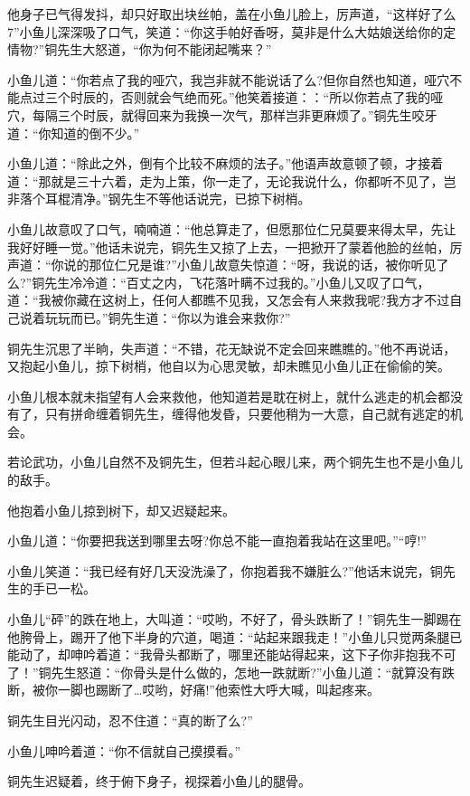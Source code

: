 \documentclass[12pt,oneside]{book}
\begin{document}
他身子已气得发抖，却只好取出块丝帕，盖在小鱼儿脸上，厉声道，``这样好了么7''小鱼儿深深吸了口气，笑道：``你这手帕好香呀，莫非是什么大姑娘送给你的定情物?''铜先生大怒道，``你为何不能闭起嘴来？''

小鱼儿道：``你若点了我的哑穴，我岂非就不能说话了么?但你自然也知道，哑穴不能点过三个时辰的，否则就会气绝而死。''他笑着接道：：``所以你若点了我的哑穴，每隔三个时辰，就得回来为我换一次气，那样岂非更麻烦了。''铜先生咬牙道：``你知道的倒不少。''

小鱼儿道：``除此之外，倒有个比较不麻烦的法子。''他语声故意顿了顿，才接着道：``那就是三十六着，走为上策，你一走了，无论我说什么，你都听不见了，岂非落个耳棍清净。''钢先生不等他话说完，已掠下树梢。

小鱼儿故意叹了口气，喃喃道：``他总算走了，但愿那位仁兄莫要来得太早，先让我好好睡一觉。''他话未说完，铜先生又掠了上去，一把掀开了蒙着他脸的丝帕，厉声道：``你说的那位仁兄是谁?''小鱼儿故意失惊道：``呀，我说的话，被你听见了么?''铜先生冷冷道：``百丈之内，飞花落叶瞒不过我的。''小鱼儿又叹了口气，道：``我被你藏在这树上，任何人都瞧不见我，又怎会有人来救我呢?我方才不过自己说着玩玩而已。''铜先生道：``你以为谁会来救你?''

铜先生沉思了半晌，失声道：``不错，花无缺说不定会回来瞧瞧的。''他不再说话，又抱起小鱼儿，掠下树梢，他自以为心思灵敏，却未瞧见小鱼儿正在偷偷的笑。

小鱼儿根本就未指望有人会来救他，他知道若是耽在树上，就什么逃走的机会都没有了，只有拼命缠着铜先生，缠得他发昏，只要他稍为一大意，自己就有逃定的机会。

若论武功，小鱼儿自然不及铜先生，但若斗起心眼儿来，两个铜先生也不是小鱼儿的敌手。

他抱着小鱼儿掠到树下，却又迟疑起来。

小鱼儿道：``你要把我送到哪里去呀?你总不能一直抱着我站在这里吧。''``哼!''

小鱼儿笑道：``我已经有好几天没洗澡了，你抱着我不嫌脏么?''他话末说完，铜先生的手已一松。

小鱼儿``砰''的跌在地上，大叫道：``哎哟，不好了，骨头跌断了！''铜先生一脚踢在他胯骨上，踢开了他下半身的穴道，喝道：``站起来跟我走！''小鱼儿只觉两条腿已能动了，却呻吟着道：``我骨头都断了，哪里还能站得起来，这下子你非抱我不可了！''铜先生怒道：``你骨头是什么做的，怎地一跌就断?''小鱼儿道：``就算没有跌断，被你一脚也踢断了\ldots 哎哟，好痛!''他索性大呼大喊，叫起疼来。

铜先生目光闪动，忍不住道：``真的断了么?''

小鱼儿呻吟着道：``你不信就自己摸摸看。''

铜先生迟疑着，终于俯下身子，视探着小鱼儿的腿骨。
\end{document}
